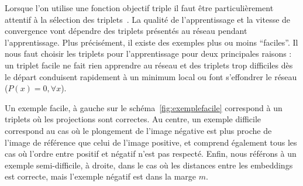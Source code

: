 Lorsque l'on utilise une fonction objectif triple il faut être particulièrement attentif à la sélection des triplets~\cite{schroff2015facenet}. 
La qualité de l'apprentissage et la vitesse de convergence vont dépendre des triplets présentés au réseau pendant l'apprentissage.
Plus précisément, il existe des exemples plus ou moins ``faciles''.
Il nous faut choisir les triplets pour l'apprentissage pour deux principales raisons : un triplet facile ne fait rien apprendre au réseau et des triplets trop difficiles dès le départ conduisent rapidement à un minimum local ou font s'effondrer le réseau ($P(x) = 0, \forall x$).

Un exemple facile, à gauche sur le schéma~\ref{fig:exemplefacile} correspond à un triplets où les projections sont correctes. Au centre, un exemple difficile correspond au cas où le plongement de l'image négative est plus proche de l'image de référence que celui de l'image positive, et comprend également tous les cas où l’ordre entre positif et négatif n’est pas respecté. Enfin, nous référons à un exemple semi-difficile, à droite, dans le cas où les distances entre les embeddings est correcte, mais l'exemple négatif est dans la marge $m$.


